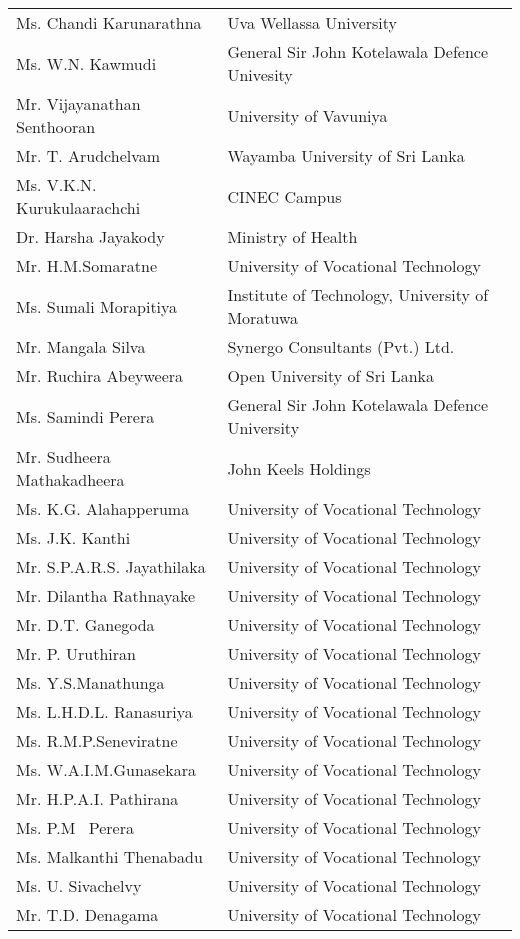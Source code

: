 \begin{longtable}{ L{4.8cm}  L{6.5cm} }
Ms. Chandi Karunarathna & Uva Wellassa University\\
Ms. W.N. Kawmudi & General Sir John Kotelawala Defence Univesity\\
Mr. Vijayanathan Senthooran & University of Vavuniya\\
Mr. T. Arudchelvam & Wayamba University of Sri Lanka\\
Ms. V.K.N. Kurukulaarachchi & CINEC Campus\\
Dr. Harsha Jayakody & Ministry of Health\\
Mr. H.M.Somaratne & University of Vocational Technology\\
Ms. Sumali Morapitiya & Institute of Technology, University of Moratuwa\\
Mr. Mangala Silva & Synergo Consultants (Pvt.) Ltd.\\
Mr. Ruchira Abeyweera & Open University of Sri Lanka\\
Ms. Samindi Perera & General Sir John Kotelawala Defence University\\
Mr. Sudheera Mathakadheera & John Keels Holdings\\
Ms. K.G. Alahapperuma & University of Vocational Technology\\
Ms. J.K. Kanthi & University of Vocational Technology\\
Mr. S.P.A.R.S. Jayathilaka & University of Vocational Technology\\
Mr. Dilantha Rathnayake & University of Vocational Technology\\
Mr. D.T. Ganegoda & University of Vocational Technology\\
Mr. P. Uruthiran & University of Vocational Technology\\
Ms. Y.S.Manathunga & University of Vocational Technology\\
Ms. L.H.D.L. Ranasuriya & University of Vocational Technology\\
Ms. R.M.P.Seneviratne & University of Vocational Technology\\
Ms. W.A.I.M.Gunasekara & University of Vocational Technology\\
Mr. H.P.A.I. Pathirana & University of Vocational Technology\\
Ms. P.M  Perera & University of Vocational Technology\\
Ms. Malkanthi Thenabadu & University of Vocational Technology\\
Ms. U. Sivachelvy & University of Vocational Technology\\
Mr. T.D. Denagama & University of Vocational Technology\\

\end{longtable}
